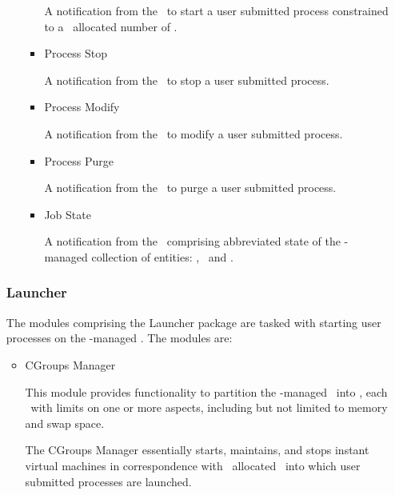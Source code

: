 \begin{itemize}
\begin{itemize}
\begin{itemize}
      A notification from the \varProcessManager~to start a user submitted 
      process constrained to a \varResourceManager~allocated number of \varShares.
      
      \item Process Stop
      
      A notification from the \varProcessManager~to stop a user submitted 
      process.
      
      \item Process Modify
            
      A notification from the \varProcessManager~to modify a user submitted 
      process.
      
      \item Process Purge
                  
      A notification from the \varProcessManager~to purge a user submitted 
      process.
      
      \item Job State
                        
      A notification from the \varProcessManager~comprising abbreviated
      state of the \varDUCC-managed collection of entities: 
      \varJobs, \varReservations~and \varServices.
      
      \end{itemize}  

    \end{itemize}     
                 
    \subsubsection{Launcher}   
          
    The modules comprising the Launcher package are tasked with
    starting user processes on the \varAgent-managed \varNodeMachineComputer.
    The modules are:
            
    \begin{itemize}
      \item CGroups Manager
      
      This module provides functionality to partition the \varAgent-managed
      \varNodeMachineComputer~into \varShares, each \varShare~with limits on one
      or more aspects, including but not limited to memory and swap space. 
      
      The CGroups Manager essentially starts, maintains, and stops instant
      virtual machines in correspondence with \varResourceManager~allocated
      \varShares~into which user submitted processes are launched.
      

\end{itemize}
\end{itemize}
